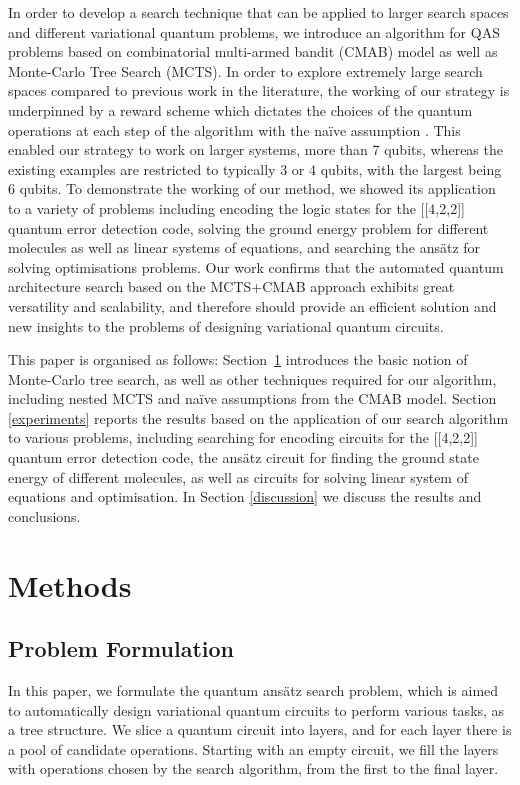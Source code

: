 \documentclass{ieeeaccess}
\begin{document}
In order to develop a search technique that can be applied to larger search spaces and different variational quantum problems, we introduce an algorithm for QAS problems based on combinatorial multi-armed bandit (CMAB) model as well as Monte-Carlo Tree Search (MCTS). In order to explore extremely large search spaces compared to previous work in the literature, the working of our strategy is underpinned by a reward scheme which dictates the choices of the quantum operations at each step of the algorithm with the na\"ive assumption \cite{CMAB_RTS}. This enabled our strategy to work on larger systems, more than 7 qubits, whereas the existing examples \cite{zhang2021differentiable, chen2021quantum, kuo2021quantum, zhang2021differentiable, du2020quantum, zhang2021neural} are restricted to typically 3 or 4 qubits, with the largest being 6 qubits. To demonstrate the working of our method, we showed its application to a variety of problems including encoding the logic states for the [[4,2,2]] quantum error detection code, solving the ground energy problem for different molecules as well as linear systems of equations, and searching the ans\"atz for solving optimisations problems. Our work confirms that the automated quantum architecture search based on the MCTS+CMAB approach exhibits great versatility and scalability, and therefore should provide an efficient solution and new insights to the problems of designing variational quantum circuits.

This paper is organised as follows: Section~\ref{methods} introduces the basic notion of Monte-Carlo tree search, as well as other techniques required for our algorithm, including nested MCTS and na\"ive assumptions from the CMAB model. Section \ref{experiments}  reports the results based on the application of our search algorithm to various problems, including searching for encoding circuits for the [[4,2,2]] quantum error detection code, the ans\"atz circuit for finding the ground state energy of different molecules, as well as circuits for solving linear system of equations and optimisation. In Section \ref{discussion} we discuss the results and conclusions.

\section{Methods}\label{methods}
\subsection{Problem Formulation}
In this paper, we formulate the quantum ans\"atz search problem, which is aimed to automatically design variational quantum circuits to perform various tasks, as a tree structure. We slice a quantum circuit into layers, and for each layer there is a pool of candidate operations. Starting with an empty circuit, we fill the layers with operations chosen by the search algorithm, from the first to the final layer. 
\end{document}
